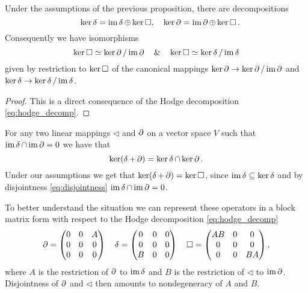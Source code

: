 \begin{corollary}
 Under the assumptions of the previous proposition, there are decompositions
  \begin{equation}
    \quad \ker \lhd = \im \lhd \oplus \ker \lap, \quad \ker \lcd = \im\lcd\oplus\ker\lap.
  \end{equation}
  Consequently we have isomorphisms
  \begin{equation}\label{eq:kerlap_iso}
    \ker \lap \simeq \ker \lcd /\im \lcd \quad\&\quad \ker \lap \simeq \ker \lhd / \im \lhd
  \end{equation}
  given by restriction to $\ker \lap$ of the canonical mappings $\ker \lcd \to \ker \lcd / \im \lcd$ and $\ker \lhd \to \ker \lhd / \im \lhd$.
\end{corollary}
\begin{proof}
 This is a direct consequence of the Hodge decomposition \eqref{eq:hodge_decomp}.
\end{proof}

\begin{remark}
 For any two linear mappings $\lhd$ and $\lcd$ on a vector space $V$ such that $\im\lhd\cap\im\lcd = 0$ we have that \[ \ker (\lhd + \lcd)  = \ker \lhd \cap \ker \lcd.\] Under our assumptions we get that $\ker (\lhd +\lcd) = \ker \lap$, since $\im \lhd \subseteq \ker \lhd$ and by disjointness \eqref{eq:disjointness} $\im \lhd \cap \im \lcd = 0$.
\end{remark}


To better understand the situation we can represent these operators in a block matrix form with respect to the Hodge decomposition \eqref{eq:hodge_decomp}
\[
 \lcd = \begin{pmatrix} 0 & 0 & A\\0&0&0\\0&0&0\end{pmatrix} \quad \lhd = \begin{pmatrix} 0 & 0 &0\\0&0&0\\ B&0&0\end{pmatrix} \quad
 \lap = \begin{pmatrix}
	  AB & 0 & 0 \\
	  0 & 0 & 0 \\
	  0 & 0 & BA
	\end{pmatrix},
\]
where $A$ is the restriction of $\lcd$ to $\im\lhd$ and $B$ is the restriction of $\lhd$ to $\im \lcd$. Disjointness of $\lcd$ and $\lhd$ then amounts to nondegeneracy of $A$ and $B$.

